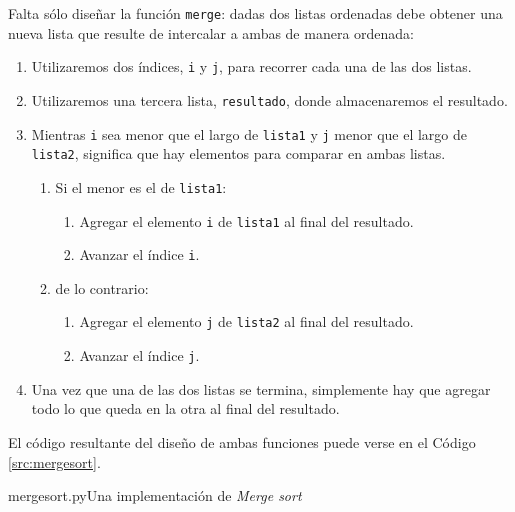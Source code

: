 Falta sólo diseñar la función \lstinline!merge!: dadas dos listas ordenadas
debe obtener una nueva lista que resulte de intercalar a ambas de manera
ordenada:

\begin{enumerate}
\item Utilizaremos dos índices, \lstinline!i! y \lstinline!j!, para recorrer
cada una de las dos listas.
\item Utilizaremos una tercera lista, \lstinline!resultado!, donde
almacenaremos el resultado.

\item Mientras \lstinline!i! sea menor que el largo de \lstinline!lista1! y
\lstinline!j! menor que el largo de \lstinline!lista2!, significa que hay
elementos para comparar en ambas listas.

\begin{enumerate}
\item Si el menor es el de \lstinline!lista1!:
\begin{enumerate}
\item Agregar el elemento \lstinline!i! de \lstinline!lista1! al final del
resultado.
\item Avanzar el índice \lstinline!i!.
\end{enumerate}
\item de lo contrario:
\begin{enumerate}
\item Agregar el elemento \lstinline!j! de \lstinline!lista2! al final del
resultado.
\item Avanzar el índice \lstinline!j!.
\end{enumerate}

\end{enumerate}

\item Una vez que una de las dos listas se termina, simplemente hay que
agregar todo lo que queda en la otra al final del resultado.
\end{enumerate}

El código resultante del diseño de ambas funciones puede verse en el Código
\ref{src:mergesort}.

\begin{codigo}{mergesort.py}{Una implementación de {\it Merge sort}}

\label{src:mergesort}
\end{codigo}

